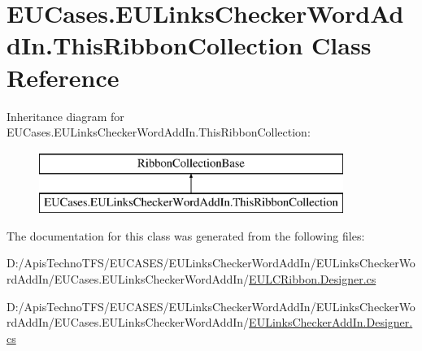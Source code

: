 \hypertarget{class_e_u_cases_1_1_e_u_links_checker_word_add_in_1_1_this_ribbon_collection}{\section{E\+U\+Cases.\+E\+U\+Links\+Checker\+Word\+Add\+In.\+This\+Ribbon\+Collection Class Reference}
\label{class_e_u_cases_1_1_e_u_links_checker_word_add_in_1_1_this_ribbon_collection}
}
Inheritance diagram for E\+U\+Cases.\+E\+U\+Links\+Checker\+Word\+Add\+In.\+This\+Ribbon\+Collection\+:\begin{figure}[H]
\begin{center}
\leavevmode
\includegraphics[height=2.000000cm]{class_e_u_cases_1_1_e_u_links_checker_word_add_in_1_1_this_ribbon_collection}
\end{center}
\end{figure}


The documentation for this class was generated from the following files\+:\begin{DoxyCompactItemize}
\item 
D\+:/\+Apis\+Techno\+T\+F\+S/\+E\+U\+C\+A\+S\+E\+S/\+E\+U\+Links\+Checker\+Word\+Add\+In/\+E\+U\+Links\+Checker\+Word\+Add\+In/\+E\+U\+Cases.\+E\+U\+Links\+Checker\+Word\+Add\+In/\hyperlink{_e_u_l_c_ribbon_8_designer_8cs}{E\+U\+L\+C\+Ribbon.\+Designer.\+cs}\item 
D\+:/\+Apis\+Techno\+T\+F\+S/\+E\+U\+C\+A\+S\+E\+S/\+E\+U\+Links\+Checker\+Word\+Add\+In/\+E\+U\+Links\+Checker\+Word\+Add\+In/\+E\+U\+Cases.\+E\+U\+Links\+Checker\+Word\+Add\+In/\hyperlink{_e_u_links_checker_add_in_8_designer_8cs}{E\+U\+Links\+Checker\+Add\+In.\+Designer.\+cs}\end{DoxyCompactItemize}
